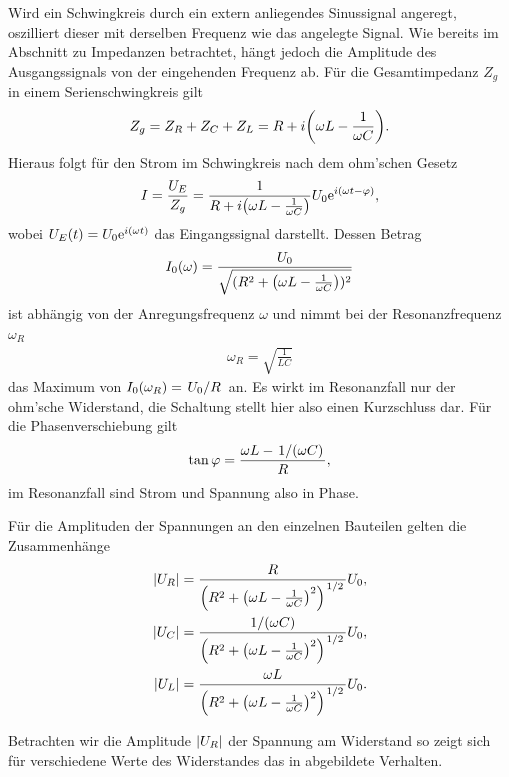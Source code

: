 Wird ein Schwingkreis durch ein extern anliegendes Sinussignal angeregt, oszilliert dieser mit derselben Frequenz wie das angelegte Signal. Wie bereits im Abschnitt zu Impedanzen betrachtet, hängt jedoch die Amplitude des Ausgangssignals von der eingehenden Frequenz ab. Für die Gesamtimpedanz $Z_g$ in einem Serienschwingkreis gilt
\begin{align}
  Z_g = Z_R + Z_C + Z_L = R + i\qty(\omega L - \frac{1}{\omega C}).
\end{align}
Hieraus folgt für den Strom im Schwingkreis nach dem ohm'schen Gesetz
\begin{align}
  I = \frac{U_E}{Z_g} = \frac{1}{R + i\qty(\omega L - \frac{1}{\omega C})} U_0 \text{e}^{i(\omega t - \varphi)},
\end{align}
wobei $U_E(t) = U_0 \text{e}^{i(\omega t)}$ das Eingangssignal darstellt. Dessen Betrag
\begin{align}
  I_0(\omega) = \frac{U_0}{\sqrt{(R^2 + \qty(\omega L - \frac{1}{\omega C}))^2}}
\end{align}
ist abhängig von der Anregungsfrequenz $\omega$ und nimmt bei der Resonanzfrequenz $\omega_R$
\begin{align}
  \omega_R = \sqrt{\frac{1}{LC}}\label{eq:rlc_omega_r}
\end{align}
das Maximum von $I_0(\omega_R) = \ffrac{U_0}{R}$ an. Es wirkt im Resonanzfall nur der ohm'sche Widerstand, die Schaltung stellt hier also einen Kurzschluss dar. Für die Phasenverschiebung gilt
\begin{align}
  \tan \varphi = \frac{\omega L - \ffrac{1}{(\omega C)}}{R},
\end{align}
im Resonanzfall sind Strom und Spannung also in Phase.

Für die Amplituden der Spannungen an den einzelnen Bauteilen gelten die Zusammenhänge
\begin{align}
\qty| U_R | = \frac{R}{\qty( R^2 + \qty( \omega L - \frac{1}{\omega C} )^2 )^{\ffrac{1}{2}}} U_0,\\
\qty| U_C | = \frac{1/(\omega C)}{\qty( R^2 + \qty( \omega L - \frac{1}{\omega C} )^2 )^{\ffrac{1}{2}}} U_0,\\
\qty| U_L | = \frac{\omega L}{\qty( R^2 + \qty( \omega L - \frac{1}{\omega C} )^2 )^{\ffrac{1}{2}}} U_0.
\end{align}

Betrachten wir die Amplitude $\qty| U_R |$ der Spannung am Widerstand so zeigt sich für verschiedene Werte des Widerstandes das in  abgebildete Verhalten. 

